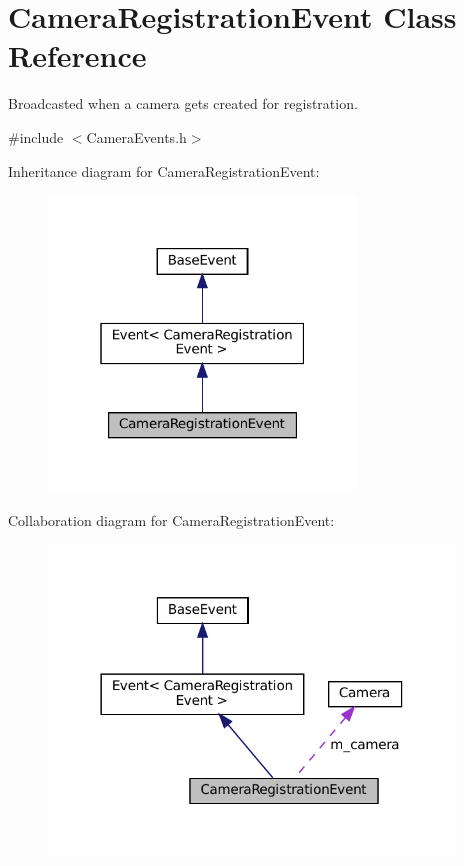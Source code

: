 \hypertarget{classCameraRegistrationEvent}{}\section{Camera\+Registration\+Event Class Reference}
\label{classCameraRegistrationEvent}


Broadcasted when a camera gets created for registration.  




{\ttfamily \#include $<$Camera\+Events.\+h$>$}



Inheritance diagram for Camera\+Registration\+Event\+:
\nopagebreak
\begin{figure}[H]
\begin{center}
\leavevmode
\includegraphics[width=232pt]{classCameraRegistrationEvent__inherit__graph}
\end{center}
\end{figure}


Collaboration diagram for Camera\+Registration\+Event\+:
\nopagebreak
\begin{figure}[H]
\begin{center}
\leavevmode
\includegraphics[width=306pt]{classCameraRegistrationEvent__coll__graph}
\end{center}
\end{figure}
